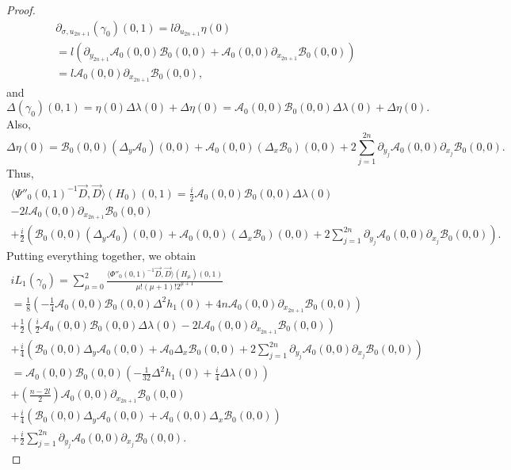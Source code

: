 \documentclass{article}
\newcommand{\mca}{\mathcal A}
\newcommand{\mcb}{\mathcal B}
\begin{document}
\begin{proof}
\begin{multline*} \partial_{\sigma, u_{2n+1}} (\gamma_0)(0,1)= l  \partial_{u_{2n+1}}\eta(0)\\ = l \left(\partial_{y_{2n+1}}\mca_0(0,0) \mcb_0(0,0) + \mca_0(0,0) \partial_{x_{2n+1}}\mcb_0(0,0) \right)\\ =l \mca_0(0,0) \partial_{x_{2n+1}}\mcb_0(0,0) ,\end{multline*}
and
\begin{equation*} \Delta(\gamma_0)(0,1) = \eta(0) \Delta\lambda(0) + \Delta \eta(0) = \mca_0(0,0) \mcb_0(0,0) \Delta\lambda(0) + \Delta \eta(0).\end{equation*}
Also,
%
\begin{equation*} \Delta \eta(0) = \mcb_0(0,0)(\Delta_y \mca_0)(0,0) + \mca_0(0,0)(\Delta_x \mcb_0)(0,0) + 2 \sum_{j=1}^{2n} \partial_{y_j} \mca_0(0,0) \partial_{x_j} \mcb_0(0,0).\end{equation*}
Thus,
\begin{multline*} \langle \Psi''_0(0,1)^{-1} \vec D, \vec D \rangle(H_{0})(0,1) =\frac i 2 \mca_0(0,0) \mcb_0(0,0) \Delta \lambda(0)\\ - 2l  \mca_0(0,0) \partial_{x_{2n+1}}\mcb_0(0,0) \\ + \frac i 2\left(  \mcb_0(0,0)(\Delta_y \mca_0)(0,0) + \mca_0(0,0)(\Delta_x \mcb_0)(0,0) + 2 \sum_{j=1}^{2n} \partial_{y_j} \mca_0(0,0) \partial_{x_j} \mcb_0(0,0)\right).\end{multline*}
Putting everything together, we obtain
\begin{multline*} iL_1(\gamma_0) =  \sum_{\mu = 0}^2 \frac{\langle \Phi''_0(0,1)^{-1} \vec D, \vec D \rangle(H_{\mu})(0,1)}{\mu! (\mu+1)! 2^{\mu + 1}}\\ = \frac 1 8\left(-\frac 1 4 \mca_0(0,0) \mcb_0(0,0) \Delta^2 h_1(0) + 4n \mca_0(0,0)\partial_{x_{2n+1}} \mcb_0(0,0)\right)\\ + \frac 1 2 \left(\frac i 2 \mca_0(0,0) \mcb_0(0,0) \Delta \lambda(0) -2l\mca_0(0,0) \partial_{x_{2n+1}} \mcb_0(0,0)\right)\\ +\frac i 4 \left(\mcb_0(0,0) \Delta_y \mca_0(0,0) +\mca_0 \Delta_x \mcb_0(0,0) + 2 \sum_{j=1}^{2n} \partial_{y_j} \mca_0(0,0) \partial_{x_j} \mcb_0(0,0) \right)\\ = \mca_0(0,0) \mcb_0(0,0) \left(-\frac 1 {32} \Delta^2 h_1(0) + \frac i 4 \Delta \lambda(0) \right)\\ +\left(\frac{n-2l} 2 \right)  \mca_0(0,0) \partial_{x_{2n+1}} \mcb_0(0,0) \\+ \frac i 4 \left(\mcb_0(0,0) \Delta_y\mca_0(0,0) + \mca_0(0,0) \Delta_x \mcb_0(0,0)\right) \\+ \frac i 2 \sum_{j=1}^{2n} \partial_{y_j} \mca_0(0,0) \partial_{x_j} \mcb_0(0,0).\end{multline*}

\end{proof}
\end{document}
